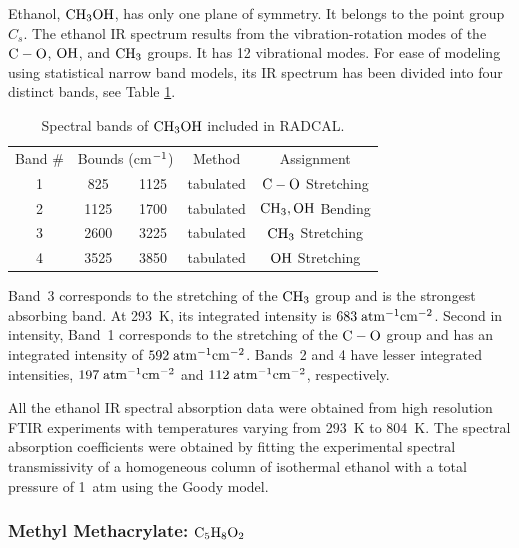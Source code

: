 Ethanol, $\rm CH_3OH$, has only one plane of symmetry. It belongs to the point group $C_{s}$. The ethanol IR spectrum results from the vibration-rotation modes of the $\rm C-O$, $\rm OH$, and $\rm CH_3$ groups. It has 12 vibrational modes. For ease of modeling using statistical narrow band models, its IR spectrum has been divided into four distinct bands, see Table \ref{Table::CH3OH}.
\begin{table}[ht]
   \centering
   \caption{Spectral bands of $\rm CH_3OH$ included in RADCAL.}
   \vspace{0.1in}
   \label{Table::CH3OH}
   \begin{tabular}{|c|c|c|c|c|}
    \hline
    Band \# & \multicolumn{2}{|l|}{Bounds (cm$\rm ^{-1}$) } & Method & Assignment \\
    \cline{1-5}
    1 & 825  & 1125 & tabulated & $\rm C-O$ Stretching   \\
    2 & 1125 & 1700 & tabulated & $\rm CH_3, OH$ Bending \\
    3 & 2600 & 3225 & tabulated & $\rm CH_3$ Stretching \\
    4 & 3525 & 3850 & tabulated & $\rm OH$ Stretching \\
    \hline
   \end{tabular}
\end{table}
Band~3 corresponds to the stretching of the $\rm CH_3$ group and is the strongest absorbing band. At 293~K, its integrated intensity is $683\;\rm {atm^{-1}cm^{-2}}$. Second in intensity, Band~1 corresponds to the stretching of the $\rm C-O$ group and has an integrated intensity of $592\;\rm {atm^{-1}cm^{-2}}$. Bands~2 and 4 have lesser integrated intensities, $197\;\rm {atm^{-1}cm^{-2}}$ and $112\;\rm {atm^{-1}cm^{-2}}$, respectively.

All the ethanol IR spectral absorption data were obtained from high resolution FTIR experiments with temperatures varying from 293~K to 804~K. The spectral absorption coefficients were obtained by fitting the experimental spectral transmissivity of a homogeneous column of isothermal ethanol with a total pressure of 1~atm using the Goody model.

\subsubsection{Methyl Methacrylate: $\rm C_5H_8O_2$}

